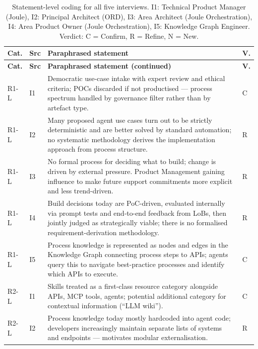 \setlength{\LTleft}{0pt}\setlength{\LTright}{0pt}
\renewcommand{\arraystretch}{1.3}
\footnotesize
\begin{longtable}{@{} p{0.9cm} p{0.7cm} p{13.8cm} p{0.7cm} @{}}
\caption{Statement-level coding for all five interviews. I1: Technical Product Manager (Joule), I2: Principal Architect (ORD), I3: Area Architect (Joule Orchestration), I4: Area Product Owner (Joule Orchestration), I5: Knowledge Graph Engineer. Verdict: C = Confirm, R = Refine, N = New.}
\label{tab:interview-coding-stmt}\\
\toprule
\textbf{Cat.} & \textbf{Src} & \textbf{Paraphrased statement} & \textbf{V.} \\
\midrule
\endfirsthead
\toprule
\textbf{Cat.} & \textbf{Src} & \textbf{Paraphrased statement (continued)} & \textbf{V.} \\
\midrule
\endhead
\bottomrule
\endlastfoot
R1-L & I1 & Democratic use-case intake with expert review and ethical criteria; POCs discarded if not productised — process spectrum handled by governance filter rather than by artefact type. & C \\
R1-L & I2 & Many proposed agent use cases turn out to be strictly deterministic and are better solved by standard automation; no systematic methodology derives the implementation approach from process structure. & R \\
R1-L & I3 & No formal process for deciding what to build; change is driven by external pressure. Product Management gaining influence to make future support commitments more explicit and less trend-driven. & R \\
R1-L & I4 & Build decisions today are PoC-driven, evaluated internally via prompt tests and end-to-end feedback from LoBs, then jointly judged as strategically viable; there is no formalised requirement-derivation methodology. & R \\
R1-L & I5 & Process knowledge is represented as nodes and edges in the Knowledge Graph connecting process steps to APIs; agents query this to navigate best-practice processes and identify which APIs to execute. & C \\
\midrule
R2-L & I1 & Skills treated as a first-class resource category alongside APIs, MCP tools, agents; potential additional category for contextual information (``LLM wiki''). & C \\
R2-L & I2 & Process knowledge today mostly hardcoded into agent code; developers increasingly maintain separate lists of systems and endpoints — motivates modular externalisation. & R \\

\end{longtable}
